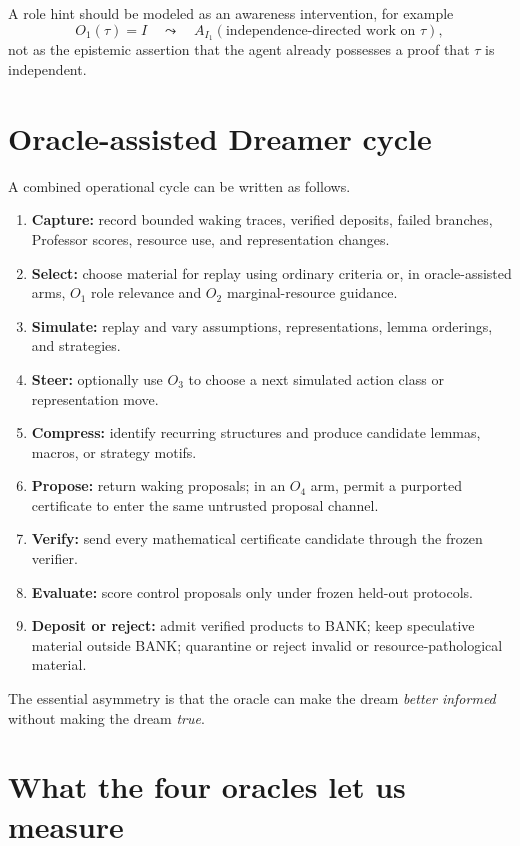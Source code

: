 \documentclass[11pt]{article}
\begin{document}
A role hint should be modeled as an awareness intervention, for example
\begin{equation}
O_1(\tau)=I
\quad\leadsto\quad
A_{I_1}(\text{independence-directed work on }\tau),
\end{equation}
not as the epistemic assertion that the agent already possesses a proof that $\tau$ is independent.

\section{Oracle-assisted Dreamer cycle}

A combined operational cycle can be written as follows.

\begin{enumerate}[leftmargin=2em]
\item \textbf{Capture:} record bounded waking traces, verified deposits, failed branches, Professor scores, resource use, and representation changes.
\item \textbf{Select:} choose material for replay using ordinary criteria or, in oracle-assisted arms, $O_1$ role relevance and $O_2$ marginal-resource guidance.
\item \textbf{Simulate:} replay and vary assumptions, representations, lemma orderings, and strategies.
\item \textbf{Steer:} optionally use $O_3$ to choose a next simulated action class or representation move.
\item \textbf{Compress:} identify recurring structures and produce candidate lemmas, macros, or strategy motifs.
\item \textbf{Propose:} return waking proposals; in an $O_4$ arm, permit a purported certificate to enter the same untrusted proposal channel.
\item \textbf{Verify:} send every mathematical certificate candidate through the frozen verifier.
\item \textbf{Evaluate:} score control proposals only under frozen held-out protocols.
\item \textbf{Deposit or reject:} admit verified products to BANK; keep speculative material outside BANK; quarantine or reject invalid or resource-pathological material.
\end{enumerate}

The essential asymmetry is that the oracle can make the dream \emph{better informed} without making the dream \emph{true}.

\section{What the four oracles let us measure}
\end{document}
